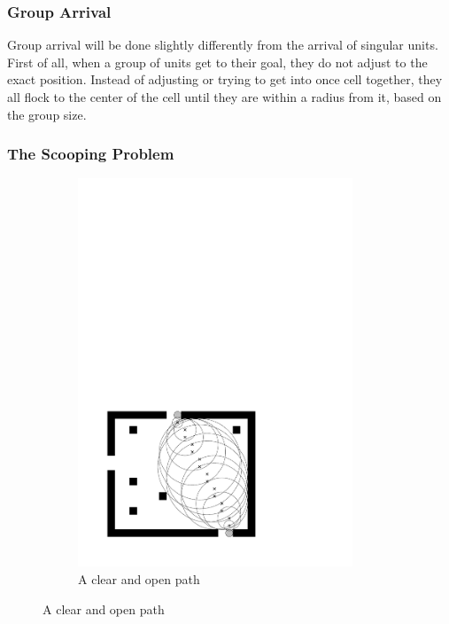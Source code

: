 \subsubsection{Group Arrival}
Group arrival will be done slightly differently from the arrival of singular units. First of all, when a group of units get to their goal, they do not adjust to the exact position. Instead of adjusting or trying to get into once cell together, they all flock to the center of the cell until they are within a radius from it, based on the group size. 

\subsubsection{The Scooping Problem}
\begin{figure}
\centering
\begin{subfigure}{0.4\textwidth}
\includegraphics[width=0.9\textwidth]{images/clear_path1.pdf}
\caption{A clear and open path}
\label{fig:clear_path}
\end{subfigure}%

\end{figure}
